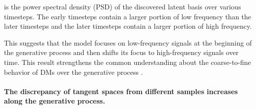  is the power spectral density (PSD) of the discovered {latent} basis over various timesteps. 
The early timesteps contain a larger portion of low frequency than the later timesteps and the later timesteps contain a larger portion of high frequency.

This suggests that the model focuses on low-frequency signals at the beginning of the generative process and then shifts its {focus} to high-frequency signals over time.
This result strengthens the common understanding
about the coarse-to-fine behavior of DMs over the generative process \cite{choi2022perception, daras2022multiresolution}.







\paragraph{{The discrepancy of tangent spaces from different samples increases along the generative process.}}
\label{sec:evolution-samples}

